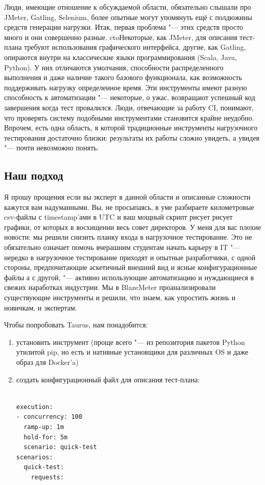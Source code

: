 \documentclass[10pt, a5paper]{article}
\begin{document}
Люди, имеющие отношение к обсуждаемой области, обязательно слышали про JMeter, Gatling, Selenium, более опытные могут упомянуть ещё с полдюжины средств генерации нагрузки. Итак, первая проблема "--- этих средств просто много и они совершенно разные. ctoНекоторые, как JMeter, для описания тест-плана требуют использования графического интерфейса, другие, как Gatling, опираются внутри на классические языки программирования (Scala, Java, Python). У них отличаются умолчания, способности распределенного выполнения и даже наличие такого базового функционала, как возможность поддерживать нагрузку определенное время. Эти инструменты имеют разную способность к автоматизации "--- некоторые, о ужас, возвращают успешный код завершения когда тест провалился. Люди, отвечающие за работу CI, понимают, что проверять систему подобными инструментами становится крайне неудобно. Впрочем, есть одна область, в которой традиционные инструменты нагрузочного тестирования достаточно близки: результаты их работы сложно увидеть, а увидев "--- почти невозможно понять.

\subsection*{Наш подход}

Я прошу прощения если вы эксперт в данной области и описанные сложности кажутся вам надуманными. Вы, не просыпаясь, в уме разбираете километровые csv-файлы с timestamp’ами в UTC и ваш мощный скрипт рисует рисует графики, от которых в восхищении весь совет директоров. У меня для вас плохие новости: мы решили снизить планку входа в нагрузочное тестирование. Это не обязательно означает помочь вчерашним студентам начать карьеру в IT "--- нередко в нагрузочное тестирование приходят и опытные разработчики, с одной стороны, предпочитающие аскетичный внешний вид и ясные конфигурационные файлы а с другой, "--- активно использующие автоматизацию и нуждающиеся в свежих наработках индустрии. Мы в BlazeMeter проанализировали существующие инструменты и решили, что знаем, как упростить жизнь и новичкам, и экспертам.

Чтобы попробовать Taurus, нам понадобится:

\begin{enumerate}
  \item установить инструмент (проще всего "--- из репозитория пакетов Python утилитой pip, но есть и нативные установщики для различных OS и даже образ для Docker’a)
  \item создать конфигурационный файл для описания тест-плана:
\lstset{ %
language=C,                 %
basicstyle=\small\sffamily, %
breaklines=true,           %
breakatwhitespace=false, %
}

\begin{lstlisting}

execution:
- concurrency: 100
  ramp-up: 1m
  hold-for: 5m
  scenario: quick-test
scenarios:
  quick-test:
    requests:
\end{lstlisting}
\end{enumerate}
\end{document}
